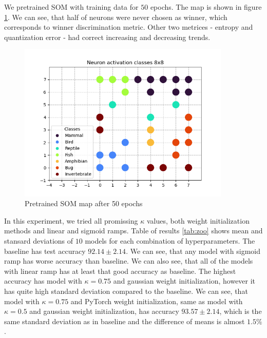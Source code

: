 We pretrained SOM with training data for $50$ epochs. The map is shown in figure \ref{fig:som-zoo}. We can see, that half of neurons were never chosen as winner, which corresponds to winner discrimination metric. Other two metrices - entropy and quantization error - had correct increasing and decreasing trends.

\begin{figure}[h!]
    \centering
    \includegraphics[width=0.9\textwidth]{figs/som1710884692.939712.png}
    \caption{Pretrained SOM map after 50 epochs}
    \label{fig:som-zoo}
\end{figure}


In this experiment, we tried all promissing $\kappa$ values, both weight initialization methods and linear and sigmoid ramps. Table of results \ref{tab:zoo} shows mean and stansard deviations of $10$ models for each combination of hyperparameters. The baseline has test accuracy $92.14\pm 2.14$. We can see, that any model with sigmoid ramp has worse accuracy than baseline. We can also see, that all of the models with linear ramp has at least that good accuracy as baseline. The highest accuracy has model with $\kappa = 0.75$ and gaussian weight initialization, however it has quite high standard deviation compared to the baseline. We can see, that model with $\kappa = 0.75$ and PyTorch weight initialization, same as model with $\kappa = 0.5$ and gaussian weight initialization, has accuracy $93.57\pm 2.14$, which is the same standard deviation as in baseline and the difference of means is almost $1.5\%$.

